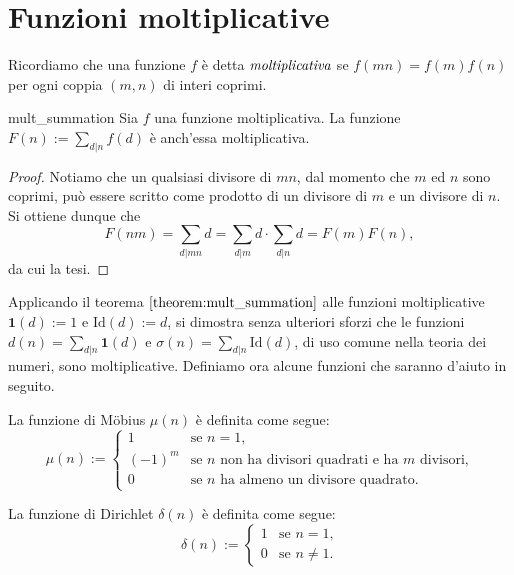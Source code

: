 \documentclass{article}
\begin{document}
\pagestyle{fancy}
\fancyhf{}
\fancyhead[R]{\nouppercase{\leftmark}}

\section{Funzioni moltiplicative}

Ricordiamo che una funzione $f$ è detta $\emph{moltiplicativa}$
se $f(mn)=f(m)f(n)$ per ogni coppia $(m,n)$ di interi coprimi.

\begin{theorem}{}{mult_summation}
	Sia $f$ una funzione moltiplicativa. La funzione		
	$F(n):=\sum_{d \vert n}f(d)$ è anch'essa moltiplicativa.
\end{theorem}
\begin{proof}
	Notiamo che un qualsiasi divisore di $mn$, dal momento che
	$m$ ed $n$ sono coprimi,
	può essere scritto come prodotto di un divisore di $m$ e un divisore di $n$.
	Si ottiene dunque che
	\begin{equation*}
		F(nm)=\sum_{d\vert mn}d=\sum_{d\vert m}d\cdot \sum_{d\vert n}d=F(m)F(n),
	\end{equation*}
	da cui la tesi.
\end{proof}

Applicando il teorema $\ref{theorem:mult_summation}$ alle funzioni moltiplicative
$\textbf{1}(d):=1$ e $\text{Id}(d):=d$, si dimostra senza ulteriori sforzi che
le funzioni $d(n)=\sum_{d\vert n}\textbf{1}(d)$
e $\sigma(n)=\sum_{d\vert n}\text{Id}(d)$, di uso comune nella teoria dei numeri,
sono moltiplicative.
Definiamo ora alcune funzioni che saranno d'aiuto in seguito.

\begin{definition}
La funzione di Möbius $\mu(n)$ è definita come segue:
\begin{equation*}
	\mu(n):=
	\begin{cases}
		1 & \text{se $n=1$,} \\
		(-1)^m & \text{se $n$ non ha divisori quadrati e ha $m$ divisori,} \\
		0 & \text{se $n$ ha almeno un divisore quadrato.}
	\end{cases}
\end{equation*}
\end{definition}

\begin{definition}
La funzione di Dirichlet $\delta(n)$ è definita come segue:
\begin{equation*}
	\delta(n):=
	\begin{cases}
		1 & \text{se $n=1$,} \\
		0 & \text{se $n\ne 1$.}
	\end{cases}
\end{equation*}
\end{definition}
\end{document}

